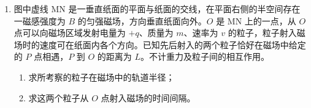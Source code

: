 \documentclass[\gkver]{gaokaozhenti}
\begin{document}
\begin{enumerate}
{$p_0 S_A + p_2 S_B + (m_A + m_B)g = p_2 S_A + p_0 S_B$ ③

设 $V_2$ 为气缸处于图 2 位置时缸内气体的体积，由玻意耳定律可得

$p_1 V_1 = p_2 V_2$ ④

由几何关系可得

$V_1 - V_2 = l(S_A - S_B)$ ⑤

由以上各式解得

$l = 9.1\times10^{-2}\Um$ ⑥

评分标准：本题 13 分。第（1）问 4 分。①式 3 分，②式 1 分。第（2）问 9 分。③式 3 分，④、⑤、⑥式各 2 分。（最后结果在 $9.0\times10^{-2}\Um \sim 0.10\Um$ 之间的同样给分）
}

\item
图中虚线 MN 是一垂直纸面的平面与纸面的交线，在平面右侧的半空间存在一磁感强度为 $B$ 的匀强磁场，方向垂直纸面向外。$O$ 是 MN 上的一点，从 $O$ 点可以向磁场区域发射电量为 $+q$、质量为 $m$、速率为 $v$ 的粒子，粒子射入磁场时的速度可在纸面内各个方向。已知先后射入的两个粒子恰好在磁场中给定的 $P$ 点相遇，$P$ 到 $O$ 的距离为 $L$。不计重力及粒子间的相互作用。
\begin{enumerate}
	\item
	求所考察的粒子在磁场中的轨道半径；
	\item
	求这两个粒子从 $O$ 点射入磁场的时间间隔。
\end{enumerate}
\end{enumerate}
\end{document}
